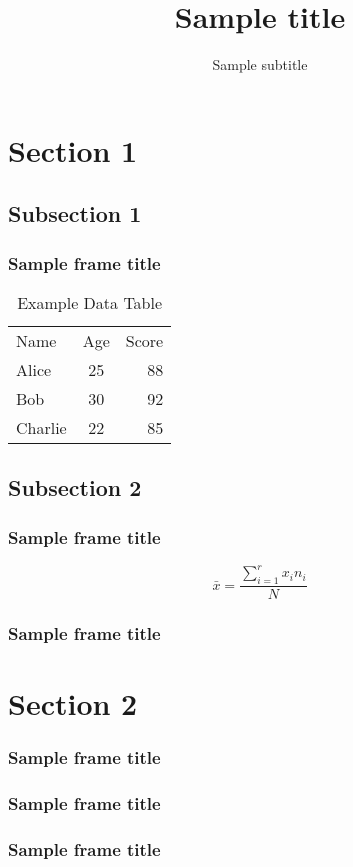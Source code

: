 \documentclass[lang=eu,biz=pls,aspectratio=169,handout]{mupresentation}
\title{Sample title}
\subtitle{Sample subtitle}
\institute{Mondragon Unibertsitatea}
\date{}
\begin{document}
\mucover

\section{Section 1}

\subsection{Subsection 1}

\begin{frame}
  \frametitle{Sample frame title}
  \begin{table}[ht]
    \centering
    \begin{tabular}{lcr}
      Name & Age & Score \\
      Alice   & 25 & 88 \\
      Bob     & 30 & 92 \\
      Charlie & 22 & 85 \\
    \end{tabular}
    \label{tab:sample}
    \caption{Example Data Table}
  \end{table}
\end{frame}

\subsection{Subsection 2}

\begin{frame}
  \frametitle{Sample frame title}
  \begin{equation*}
    \bar{x} = \frac{\sum\limits_{i=1}^{r} x_i n_i}{N}
  \end{equation*}
\end{frame}

\begin{frame}
  \frametitle{Sample frame title}
  \lipsum[2]
\end{frame}

\section{Section 2}

\begin{frame}
  \frametitle{Sample frame title}
  \lipsum[2]
\end{frame}

\begin{frame}
  \frametitle{Sample frame title}
  \lipsum[2]
\end{frame}

\begin{frame}
  \frametitle{Sample frame title}
  \lipsum[2]
\end{frame}

\end{document}
